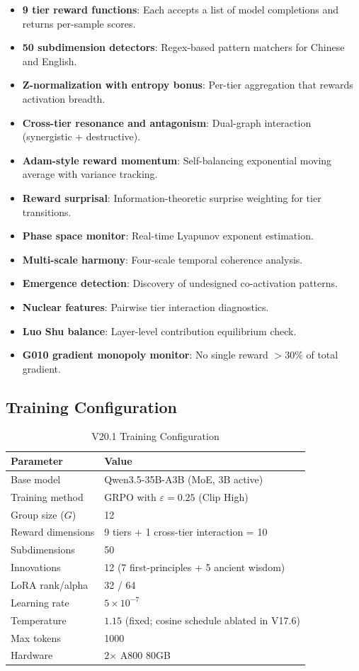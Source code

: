 \documentclass{article}
\begin{document}
\begin{itemize}
    \item \textbf{9 tier reward functions}: Each accepts a list of model completions and returns per-sample scores.
    \item \textbf{50 subdimension detectors}: Regex-based pattern matchers for Chinese and English.
    \item \textbf{Z-normalization with entropy bonus}: Per-tier aggregation that rewards activation breadth.
    \item \textbf{Cross-tier resonance and antagonism}: Dual-graph interaction (synergistic + destructive).
    \item \textbf{Adam-style reward momentum}: Self-balancing exponential moving average with variance tracking.
    \item \textbf{Reward surprisal}: Information-theoretic surprise weighting for tier transitions.
    \item \textbf{Phase space monitor}: Real-time Lyapunov exponent estimation.
    \item \textbf{Multi-scale harmony}: Four-scale temporal coherence analysis.
    \item \textbf{Emergence detection}: Discovery of undesigned co-activation patterns.
    \item \textbf{Nuclear features}: Pairwise tier interaction diagnostics.
    \item \textbf{Luo Shu balance}: Layer-level contribution equilibrium check.
    \item \textbf{G010 gradient monopoly monitor}: No single reward $>30\%$ of total gradient.
\end{itemize}

\subsection{Training Configuration}

\begin{table}[h]
\centering
\caption{V20.1 Training Configuration}
\begin{tabular}{@{}ll@{}}
\toprule
\textbf{Parameter} & \textbf{Value} \\
\midrule
Base model & Qwen3.5-35B-A3B (MoE, 3B active) \\
Training method & GRPO with $\varepsilon = 0.25$ (Clip High) \\
Group size ($G$) & 12 \\
Reward dimensions & 9 tiers + 1 cross-tier interaction = 10 \\
Subdimensions & 50 \\
Innovations & 12 (7 first-principles + 5 ancient wisdom) \\
LoRA rank/alpha & 32 / 64 \\
Learning rate & $5 \times 10^{-7}$ \\
Temperature & $1.15$ (fixed; cosine schedule ablated in V17.6) \\
Max tokens & 1000 \\
Hardware & 2$\times$ A800 80GB \\
\bottomrule
\end{tabular}
\end{table}
\end{document}
